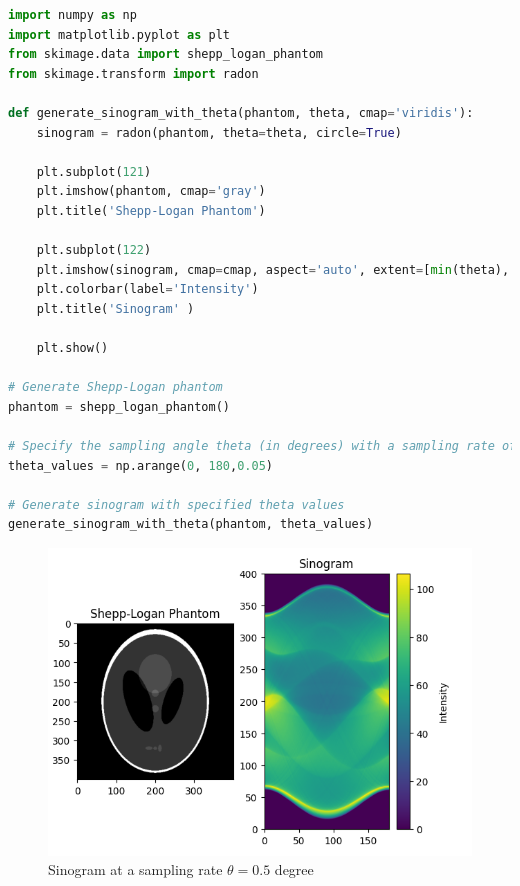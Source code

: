 \documentclass{article}
\begin{document}
\begin{lstlisting}[language=Python, style=python, caption={Python code for generating sinogram}]
import numpy as np
import matplotlib.pyplot as plt
from skimage.data import shepp_logan_phantom
from skimage.transform import radon

def generate_sinogram_with_theta(phantom, theta, cmap='viridis'):
    sinogram = radon(phantom, theta=theta, circle=True)
    
    plt.subplot(121)
    plt.imshow(phantom, cmap='gray')
    plt.title('Shepp-Logan Phantom')

    plt.subplot(122)
    plt.imshow(sinogram, cmap=cmap, aspect='auto', extent=[min(theta), max(theta), 0, sinogram.shape[0]])
    plt.colorbar(label='Intensity')
    plt.title('Sinogram' )

    plt.show()

# Generate Shepp-Logan phantom
phantom = shepp_logan_phantom()

# Specify the sampling angle theta (in degrees) with a sampling rate of 0.05 degrees
theta_values = np.arange(0, 180,0.05)

# Generate sinogram with specified theta values
generate_sinogram_with_theta(phantom, theta_values)

\end{lstlisting}
\begin{figure}
    \centering
    \includegraphics[width=0.8\linewidth]{Sinogram.png}
    \caption{Sinogram at a sampling rate $\theta=0.5$ degree}
    \label{fig:enter-label}
\end{figure}
\newpage
\end{document}
